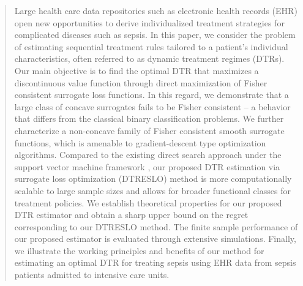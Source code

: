 \documentclass[preprint] {imsart}
\begin{document}
\begin{frontmatter}
\begin{abstract}
Large health care data repositories such as electronic health records (EHR) open new opportunities to derive individualized treatment strategies for complicated diseases such as sepsis. In this paper, we consider the problem of estimating sequential treatment rules tailored to a patient's individual characteristics, often referred to as dynamic treatment regimes (DTRs). Our main objective is to find the optimal DTR that maximizes a discontinuous value function through direct maximization of Fisher consistent surrogate loss functions. In this regard, we demonstrate that a large class of concave surrogates fails to be Fisher consistent -- a behavior that differs from the classical binary classification problems. We further characterize a non-concave family of Fisher consistent smooth surrogate functions, {\color{black} which\label{page: off-the-shelves} is amenable to gradient-descent type optimization algorithms}. Compared to the existing direct search approach under the support vector machine framework \citep{zhao2015}, our proposed DTR estimation via surrogate loss optimization (DTRESLO) method is more computationally scalable to large sample sizes and allows for broader functional classes for treatment policies. We establish theoretical properties for our proposed DTR estimator and obtain a sharp upper bound on the regret corresponding to our DTRESLO method. The finite sample performance of our proposed estimator is evaluated through extensive simulations. Finally, we illustrate the working principles and benefits of our method for estimating an optimal DTR for treating sepsis using EHR data from sepsis patients admitted to intensive care units.


\end{abstract}
\end{frontmatter}
\end{document}
